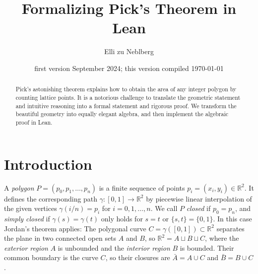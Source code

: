 \documentclass[a4paper]{amsart}
\title{Formalizing Pick's Theorem in Lean}
\author{Elli zu Neblberg}
\date{first version September 2024; this version compiled \today}
\numberwithin{equation}{section}
\theoremstyle{plain}
\theoremstyle{definition}
\newcommand{\R}{\mathbb{R}}
\begin{document}

\begin{abstract}
  Pick's astonishing theorem explains how to obtain %
  the area of any integer polygon by counting lattice points. %
  It is a notorious challenge %
  to translate the geometric statement and intuitive reasoning
  into a formal statement and rigorous proof. %
  We transform the beautiful geometry into equally elegant algebra,
  and then implement the algebraic proof in Lean.  
\end{abstract}

\maketitle


\section{Introduction} \label{sec:Introduction}




A \emph{polygon} $P = (p_0,p_1,\ldots,p_n)$ is %
a finite sequence of points $p_i = (x_i,y_i) \in \R^2$.
It defines the corresponding path $\gamma \colon [0,1] \to \R^2$
by piecewise linear interpolation of the given vertices
$\gamma(i/n) = p_i$ for $i=0,1,\dots,n$.
We call $P$ \emph{closed} if $p_0 = p_n$, and
\emph{simply closed} if $\gamma(s) = \gamma(t)$
only holds for $s = t$ or $\{s,t\} = \{0,1\}$.
In this case Jordan's theorem applies:
The polygonal curve $C = \gamma([0,1]) \subset \R^2$
separates the plane in two connected open sets $A$ and $B$,
so $\R^2 = A \sqcup B \sqcup C$, where the \emph{exterior region} $A$
is unbounded and the \emph{interior region} $B$ is bounded.
Their common boundary is the curve $C$, so their closures
are $\bar{A} = A \cup C$ and $\bar{B} = B \cup C$.
\end{document}
